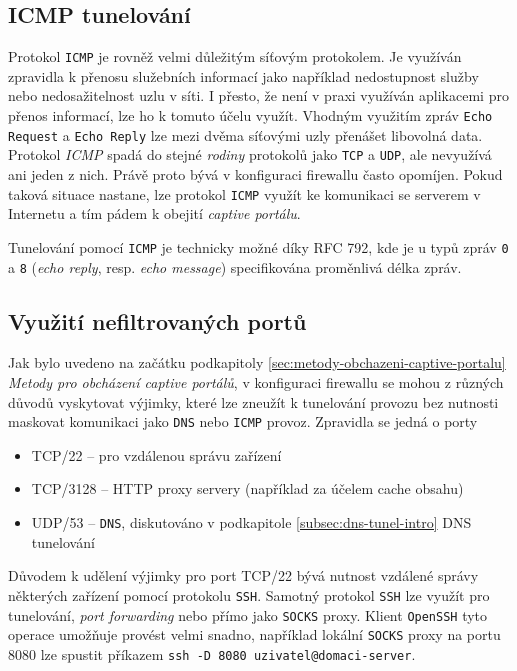 \documentclass[thesis=M,czech]{FITthesis}[2012/10/20]
\begin{document}
\subsection{ICMP tunelování}

Protokol \texttt{ICMP} je rovněž velmi důležitým síťovým protokolem. Je využíván zpravidla k přenosu služebních informací jako například nedostupnost služby nebo nedosažitelnost uzlu v síti. I přesto, že není v praxi využíván aplikacemi pro přenos informací, lze ho k tomuto účelu využít. Vhodným využitím zpráv \texttt{Echo Request} a \texttt{Echo Reply} lze mezi dvěma síťovými uzly přenášet libovolná data. Protokol \textit{ICMP} spadá do stejné \textit{rodiny} protokolů jako \texttt{TCP} a \texttt{UDP}, ale nevyužívá ani jeden z nich. Právě proto bývá v konfiguraci firewallu často opomíjen. Pokud taková situace nastane, lze protokol \texttt{ICMP} využít ke komunikaci se serverem v Internetu a tím pádem k obejití \textit{captive portálu}.

Tunelování pomocí \texttt{ICMP} je technicky možné díky RFC 792\cite{rfc792}, kde je u typů zpráv \texttt{0} a \texttt{8} (\textit{echo reply}, resp. \textit{echo message}) specifikována proměnlivá délka zpráv.

\subsection{Využití nefiltrovaných portů}
\label{subsec:nonfiltered-ports}
Jak bylo uvedeno na začátku podkapitoly \ref{sec:metody-obchazeni-captive-portalu} \textit{Metody pro obcházení captive portálů}, v konfiguraci firewallu se mohou z různých důvodů vyskytovat výjimky, které lze zneužít k tunelování provozu bez nutnosti maskovat komunikaci jako \texttt{DNS} nebo \texttt{ICMP} provoz. Zpravidla\cite{defcon-captive-article} se jedná o porty 

\begin{itemize}
 \item TCP/22 -- pro vzdálenou správu zařízení
 \item TCP/3128 -- HTTP proxy servery (například za účelem cache obsahu)
 \item UDP/53 -- \texttt{DNS}, diskutováno v podkapitole \ref{subsec:dns-tunel-intro} DNS tunelování
\end{itemize}

Důvodem k udělení výjimky pro port TCP/22 bývá nutnost vzdálené správy některých zařízení pomocí protokolu \texttt{SSH}. Samotný protokol \texttt{SSH} lze využít pro tunelování, \textit{port forwarding} nebo přímo jako \texttt{SOCKS} proxy. Klient \texttt{OpenSSH} tyto operace umožňuje provést velmi snadno, například lokální \texttt{SOCKS} proxy na portu 8080 lze spustit příkazem \texttt{ssh -D 8080 uzivatel@domaci-server}.
\end{document}
